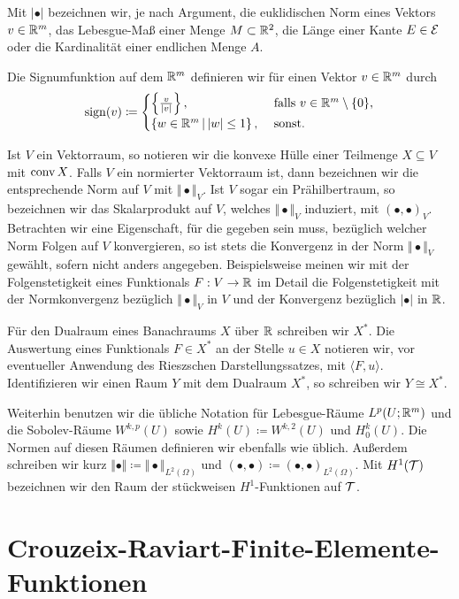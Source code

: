 Mit $|\bullet|$ bezeichnen wir, je nach Argument, die euklidischen Norm eines
Vektors $v\in\mathbb{R}^m$, das Lebesgue-Maß einer Menge $M\subset\mathbb{R}^2$, die Länge
einer Kante $E\in\mathcal{E}$ oder die Kardinalität einer endlichen Menge $A$.

Die Signumfunktion auf dem $\mathbb{R}^m$ definieren wir für einen Vektor
$v\in\mathbb{R}^m$ durch
\begin{align*}
  \operatorname{sign}(v)\coloneqq
  \begin{cases}
    \left\{\frac{v}{|v|}\right\},&\text{ falls }v\in\mathbb{R}^m\setminus\{0\},\\
    \left\{w\in\mathbb{R}^m\,\middle|\,|w|\leq 1\right\},&\text{ sonst.}
  \end{cases}
\end{align*}

Ist $V$ ein Vektorraum, so notieren wir die konvexe Hülle einer Teilmenge
$X\subseteq V$ mit $\textup{conv}\,X$.
Falls $V$ ein normierter Vektorraum ist, dann bezeichnen wir die entsprechende
Norm auf $V$ mit $\Vert\bullet\Vert_V$. 
Ist $V$ sogar ein Prähilbertraum, so bezeichnen wir das Skalarprodukt auf
$V$, welches $\Vert\bullet\Vert_V$ induziert, mit $(\bullet,\bullet)_V$.
Betrachten wir eine Eigenschaft, für die gegeben sein muss, bezüglich welcher
Norm Folgen auf $V$ konvergieren, so ist stets die Konvergenz in der Norm
$\Vert\bullet\Vert_V$ gewählt, sofern nicht anders angegeben.
Beispielsweise meinen wir mit der Folgenstetigkeit eines Funktionals
$F:V\to\mathbb{R}$ im Detail die Folgenstetigkeit mit der Normkonvergenz
bezüglich $\Vert\bullet\Vert_V$ in $V$ und der Konvergenz bezüglich $|\bullet|$
in $\mathbb{R}$.

Für den Dualraum eines Banachraums $X$ über $\mathbb{R}$ 
schreiben wir $X^\ast$. Die Auswertung eines Funktionals $F\in X^\ast$ an
der Stelle $u\in X$ notieren wir, vor eventueller 
Anwendung des Rieszschen Darstellungssatzes, mit $\langle F,u\rangle$.
Identifizieren wir einen Raum $Y$ mit dem Dualraum $X^\ast$, so schreiben
wir $Y\cong X^\ast$.

Weiterhin benutzen wir die übliche Notation für Lebesgue-Räume
$L^p\!\left(U;\mathbb{R}^m\right)$ und die So\-bo\-lev-Räume $W^{k,p}(U)$ sowie
$H^k(U)\coloneqq W^{k,2}(U)$ und $H^k_0(U)$. Die Normen auf diesen Räumen
definieren wir ebenfalls wie üblich.
Außerdem schreiben wir kurz $\Vert\bullet\Vert \coloneqq
\Vert\bullet\Vert_{L^2(\Omega)}$
und $(\bullet,\bullet)\coloneqq(\bullet,\bullet)_{L^2(\Omega)}$.
Mit $H^1(\mathcal{T})$ bezeichnen wir den Raum der stückweisen $H^1$-Funktionen auf
$\mathcal{T}$.


\section{Crouzeix-Raviart-Finite-Elemente-Funktionen}
\label{sec:crouzeixRaviartFunctions}

